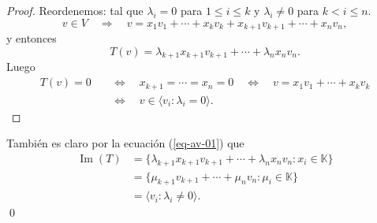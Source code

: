 \documentclass{beamer} %
\newcommand{\img}{\operatorname{Im}}
\newcommand{\nuc}{\operatorname{Nu}}
\newcommand{\K}{\mathbb K}
\begin{document}
\begin{frame}
    \pause
    \begin{proof}\pause Reordenemos:  tal que  $\lambda_i =0$ para $1 \le i \le k$ y $\lambda_i \ne 0$ para $k < i \le n$. 
    $$
    v \in V \quad \Rightarrow \quad v = x_1v_1 + \cdots+ x_k v_k+ x_{k+1} v_{k+1}+\cdots+ x_n v_n,
    $$
    y entonces
    \begin{equation}\label{eq-av-01}
        T(v) =  \lambda_{k+1}x_{k+1} v_{k+1}+\cdots+ \lambda_nx_n v_n.
    \end{equation}
    Luego 
    \begin{align*}
        T(v) =0 \quad &\Leftrightarrow \quad x_{k+1} = \cdots = x_n=0  \quad \Leftrightarrow \quad v =  x_1v_1 + \cdots+ x_k v_k \\
        \quad &\Leftrightarrow \quad v \in \langle v_i: \lambda_i =0 \rangle. 
    \end{align*}
    
    \end{proof}
\end{frame}



\begin{frame}
    
    También es claro por la ecuación (\ref{eq-av-01}) que 
    \begin{align*}
        \img(T) &= \{\lambda_{k+1}x_{k+1} v_{k+1}+\cdots+ \lambda_nx_n v_n: x_i \in \K \} \\
        &=\{\mu_{k+1} v_{k+1}+\cdots+ \mu_n v_n: \mu_i \in \K \}\\
        &= \langle v_i: \lambda_i \not=0 \rangle.
    \end{align*}
    \qed
    \vskip 3cm
\end{frame}
\end{document}
